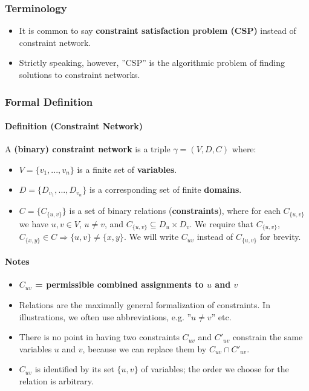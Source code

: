 \documentclass[conference, a4paper]{styles/acmsiggraph}
\newcommand\subsubsubsection{\paragraph}
\begin{document}
        \subsubsection{Terminology}
            \begin{itemize}
                \item It is common to say \textbf{constraint satisfaction problem (CSP)} instead of constraint network.
                \item Strictly speaking, however, ''CSP'' is the algorithmic problem of finding solutions to constraint networks.
            \end{itemize}
                
        \subsubsection{Formal Definition}
            \subsubsubsection{Definition (Constraint Network)}
                A \textbf{(binary) constraint network} is a triple $\gamma = (V,D,C)$ where:
                    \begin{itemize}
                        \item $V = \{v_1,...,v_n\}$ is a finite set of \textbf{variables}.
                        \item $D = \{D_{v_1},...,D_{v_n}\}$ is a corresponding set of finite \textbf{domains}.
                        \item $C = \{C_{\{u,v\}}\}$ is a set of binary relations (\textbf{constraints}), where for each $C_{\{u,v\}}$ we have $u,v \in V$, $u \neq v$, and $C_{\{u,v\}} \subseteq D_u \times D_v$.
                        We require that $C_{\{u,v\}}$, $C_{\{x,y\}} \in C \Rightarrow \{u,v\} \neq \{x,y\}$.\newline
                        We will write $C_{uv}$ instead of $C_{\{u,v\}}$ for brevity.
                    \end{itemize}
            
            \subsubsubsection{Notes}
                \begin{itemize}
                    \item \textbf{$C_{uv}$ = permissible combined assignments to $u$ and $v$}
                    \item Relations are the maximally general formalization of constraints. In illustrations, we often use abbreviations, e.g. ''$u \neq v$'' etc.
                    \item There is no point in having two constraints $C_{uv}$ and $C'_{uv}$ constrain the same variables $u$ and $v$, because we can replace them by $C_{uv} \cap C'_{uv}$.
                    \item $C_{uv}$ is identified by its set $\{u,v\}$ of variables; the order we choose for the relation is arbitrary.
                \end{itemize}
    
\end{document}
